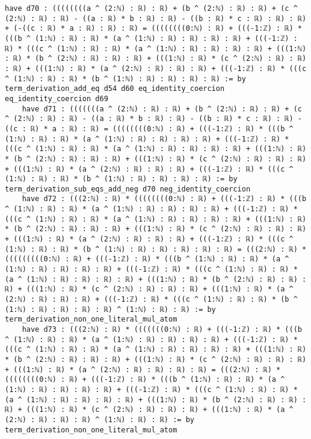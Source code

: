 \documentclass{article}
\begin{document}
\begin{tcolorbox}[colback=white!10, width=\linewidth]
\begin{lstlisting}[language=Lean4]
    have d70 : ((((((((a ^ (2:ℕ) : ℝ) : ℝ) + (b ^ (2:ℕ) : ℝ) : ℝ) + (c ^ (2:ℕ) : ℝ) : ℝ) - ((a : ℝ) * b : ℝ) : ℝ) - ((b : ℝ) * c : ℝ) : ℝ) : ℝ) + (-((c : ℝ) * a : ℝ) : ℝ) : ℝ) = ((((((((0:ℕ) : ℝ) + (((-1:ℤ) : ℝ) * (((b ^ (1:ℕ) : ℝ) : ℝ) * (a ^ (1:ℕ) : ℝ) : ℝ) : ℝ) : ℝ) + (((-1:ℤ) : ℝ) * (((c ^ (1:ℕ) : ℝ) : ℝ) * (a ^ (1:ℕ) : ℝ) : ℝ) : ℝ) : ℝ) + (((1:ℕ) : ℝ) * (b ^ (2:ℕ) : ℝ) : ℝ) : ℝ) + (((1:ℕ) : ℝ) * (c ^ (2:ℕ) : ℝ) : ℝ) : ℝ) + (((1:ℕ) : ℝ) * (a ^ (2:ℕ) : ℝ) : ℝ) : ℝ) + (((-1:ℤ) : ℝ) * (((c ^ (1:ℕ) : ℝ) : ℝ) * (b ^ (1:ℕ) : ℝ) : ℝ) : ℝ) : ℝ) := by term_derivation_add_eq d54 d60 eq_identity_coercion eq_identity_coercion d69
    have d71 : (((((((a ^ (2:ℕ) : ℝ) : ℝ) + (b ^ (2:ℕ) : ℝ) : ℝ) + (c ^ (2:ℕ) : ℝ) : ℝ) - ((a : ℝ) * b : ℝ) : ℝ) - ((b : ℝ) * c : ℝ) : ℝ) - ((c : ℝ) * a : ℝ) : ℝ) = ((((((((0:ℕ) : ℝ) + (((-1:ℤ) : ℝ) * (((b ^ (1:ℕ) : ℝ) : ℝ) * (a ^ (1:ℕ) : ℝ) : ℝ) : ℝ) : ℝ) + (((-1:ℤ) : ℝ) * (((c ^ (1:ℕ) : ℝ) : ℝ) * (a ^ (1:ℕ) : ℝ) : ℝ) : ℝ) : ℝ) + (((1:ℕ) : ℝ) * (b ^ (2:ℕ) : ℝ) : ℝ) : ℝ) + (((1:ℕ) : ℝ) * (c ^ (2:ℕ) : ℝ) : ℝ) : ℝ) + (((1:ℕ) : ℝ) * (a ^ (2:ℕ) : ℝ) : ℝ) : ℝ) + (((-1:ℤ) : ℝ) * (((c ^ (1:ℕ) : ℝ) : ℝ) * (b ^ (1:ℕ) : ℝ) : ℝ) : ℝ) : ℝ) := by term_derivation_sub_eqs_add_neg d70 neg_identity_coercion
    have d72 : (((2:ℕ) : ℝ) * ((((((((0:ℕ) : ℝ) + (((-1:ℤ) : ℝ) * (((b ^ (1:ℕ) : ℝ) : ℝ) * (a ^ (1:ℕ) : ℝ) : ℝ) : ℝ) : ℝ) + (((-1:ℤ) : ℝ) * (((c ^ (1:ℕ) : ℝ) : ℝ) * (a ^ (1:ℕ) : ℝ) : ℝ) : ℝ) : ℝ) + (((1:ℕ) : ℝ) * (b ^ (2:ℕ) : ℝ) : ℝ) : ℝ) + (((1:ℕ) : ℝ) * (c ^ (2:ℕ) : ℝ) : ℝ) : ℝ) + (((1:ℕ) : ℝ) * (a ^ (2:ℕ) : ℝ) : ℝ) : ℝ) + (((-1:ℤ) : ℝ) * (((c ^ (1:ℕ) : ℝ) : ℝ) * (b ^ (1:ℕ) : ℝ) : ℝ) : ℝ) : ℝ) : ℝ) = (((2:ℕ) : ℝ) * (((((((((0:ℕ) : ℝ) + (((-1:ℤ) : ℝ) * (((b ^ (1:ℕ) : ℝ) : ℝ) * (a ^ (1:ℕ) : ℝ) : ℝ) : ℝ) : ℝ) + (((-1:ℤ) : ℝ) * (((c ^ (1:ℕ) : ℝ) : ℝ) * (a ^ (1:ℕ) : ℝ) : ℝ) : ℝ) : ℝ) + (((1:ℕ) : ℝ) * (b ^ (2:ℕ) : ℝ) : ℝ) : ℝ) + (((1:ℕ) : ℝ) * (c ^ (2:ℕ) : ℝ) : ℝ) : ℝ) + (((1:ℕ) : ℝ) * (a ^ (2:ℕ) : ℝ) : ℝ) : ℝ) + (((-1:ℤ) : ℝ) * (((c ^ (1:ℕ) : ℝ) : ℝ) * (b ^ (1:ℕ) : ℝ) : ℝ) : ℝ) : ℝ) ^ (1:ℕ) : ℝ) : ℝ) := by term_derivation_non_one_literal_mul_atom
    have d73 : (((2:ℕ) : ℝ) * (((((((0:ℕ) : ℝ) + (((-1:ℤ) : ℝ) * (((b ^ (1:ℕ) : ℝ) : ℝ) * (a ^ (1:ℕ) : ℝ) : ℝ) : ℝ) : ℝ) + (((-1:ℤ) : ℝ) * (((c ^ (1:ℕ) : ℝ) : ℝ) * (a ^ (1:ℕ) : ℝ) : ℝ) : ℝ) : ℝ) + (((1:ℕ) : ℝ) * (b ^ (2:ℕ) : ℝ) : ℝ) : ℝ) + (((1:ℕ) : ℝ) * (c ^ (2:ℕ) : ℝ) : ℝ) : ℝ) + (((1:ℕ) : ℝ) * (a ^ (2:ℕ) : ℝ) : ℝ) : ℝ) : ℝ) = (((2:ℕ) : ℝ) * ((((((((0:ℕ) : ℝ) + (((-1:ℤ) : ℝ) * (((b ^ (1:ℕ) : ℝ) : ℝ) * (a ^ (1:ℕ) : ℝ) : ℝ) : ℝ) : ℝ) + (((-1:ℤ) : ℝ) * (((c ^ (1:ℕ) : ℝ) : ℝ) * (a ^ (1:ℕ) : ℝ) : ℝ) : ℝ) : ℝ) + (((1:ℕ) : ℝ) * (b ^ (2:ℕ) : ℝ) : ℝ) : ℝ) + (((1:ℕ) : ℝ) * (c ^ (2:ℕ) : ℝ) : ℝ) : ℝ) + (((1:ℕ) : ℝ) * (a ^ (2:ℕ) : ℝ) : ℝ) : ℝ) ^ (1:ℕ) : ℝ) : ℝ) := by term_derivation_non_one_literal_mul_atom

\end{lstlisting}
\end{tcolorbox}
\end{document}
